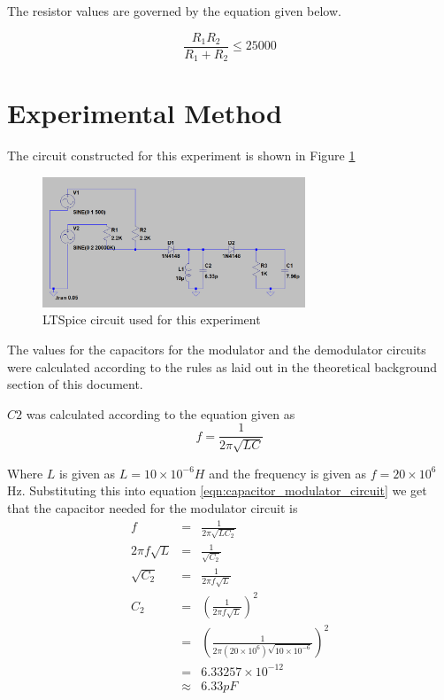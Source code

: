 \documentclass[12pt, a4paper]{article}
\begin{document}
 	The resistor values are governed by the equation given below.

 	\[
 		\frac{R_1R_2}{R_1+R_2} \le 25000
 	\]



\section{Experimental Method} %
\label{sec:experimental_method}
	The circuit constructed for this experiment is shown in Figure \ref{fig:circuit_1}
	\begin{figure}[H]
		\centering
		\label{fig:circuit_1}
		\includegraphics[width=0.7\textwidth]{images/circuit_1.png}
		\caption{LTSpice circuit used for this experiment}
	\end{figure}

	The values for the capacitors for the modulator and the demodulator circuits were calculated according to the rules as laid out in the theoretical background section of this document.

	$C2$ was calculated according to the equation given as 
	\begin{equation}
		f =  \frac{1}{2\pi\sqrt{LC}} 
		\label{eqn:capacitor_modulator_circuit}
	\end{equation}

	Where $L$ is given as $L = 10\times10^{-6}H$ and the frequency is given as $f= 20\times 10^6 $Hz. Substituting this into equation \ref{eqn:capacitor_modulator_circuit} we get that the capacitor needed for the modulator circuit is
	\[
		\begin{array}{rcl}
			f & = & \frac{1}{2\pi\sqrt{LC_2}} \\
			2\pi f \sqrt{L} & = & \frac{1}{\sqrt{C_2}} \\
			\sqrt{C_2} & = & \frac{1}{2\pi f \sqrt{L}} \\
			C_2 & = & \left(\frac{1}{2\pi f \sqrt{L}}\right)^2 \\
			& = & \left(\frac{1}{2\pi(20\times 10^6)\sqrt{10\times 10^{-6}}}\right)^2 \\
			& = & 6.33257 \times 10^{-12} \\
			& \approx & 6.33 pF 
		\end{array}
	\]
	
\end{document}
